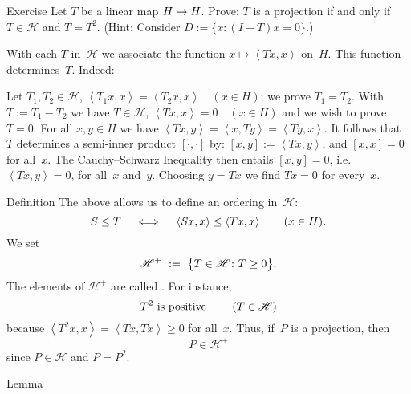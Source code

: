 \documentclass[main.tex]{subfiles}
\begin{document}
%
%
\begin{psec}{5.7}{Exercise}
Let $T$ be a linear map $H\rightarrow H$.
Prove: $T$ is a projection
if and only if~$T\in\mathscr H$ and $T=T^2$.
(Hint: Consider $D:=\{x\colon (I-T)x=0\}$.)
\end{psec}
%
%
\begin{psec}{5.8}%
With each $T$ in~$\mathscr H$
we associate the function 
$x\mapsto\left<Tx,x\right>$ on~$H$.
This function determines~$T$.
Indeed:

Let $T_1,T_2\in\mathscr H$,
$\left< T_1 x,x\right> = \left<T_2 x,x\right>\quad (x\in H)$;
we prove $T_1 = T_2$.
With $T:=T_1 - T_2$
we have $T\in\mathscr H$,
$\left< Tx,x\right>=0\quad (x\in H)$
and we wish to prove~$T=0$.
For all $x,y\in H$ we have
$\left<Tx,y\right>=\left<x,Ty\right>=\left<Ty,x\right>$.
It follows that~$T$ determines a semi-inner product $[\cdot,\cdot]$
by: $[x,y]:=\left<Tx,y\right>$,
and $[x,x]=0$ for all~$x$.
The Cauchy--Schwarz Inequality then entails $[x,y]=0$,
i.e. $\left<Tx,y\right>=0$, for all~$x$ and~$y$.
Choosing $y=Tx$ we find $Tx=0$ for every~$x$.
\end{psec}
%
%
\begin{psec}{5.9}{Definition}
The above allows us to define an ordering in~$\mathscr H$:
\begin{equation*}
S\leq T\quad \iff \quad
\left<Sx,x\right>\leq \left<Tx,x\right>\qquad (x\in H)\text{.}
\end{equation*}
We set
\begin{equation*}
{\mathscr H}^+ \ :=\ \bigl\{T\in\mathscr H\colon T\geq 0\bigr\}\htam{.}
\end{equation*}
The elements of ${\mathscr H}^+$ are called
.
For instance,
\begin{equation*}
T^2\text{\  is positive }\qquad (T\in\mathscr H)
\end{equation*}
because $\left< T^2 x, x\right> = \left<Tx,Tx\right>\geq 0$
for all~$x$.
Thus,
if~$P$ is a projection,
then
\begin{equation*}
P\in{\mathscr H}^+
\end{equation*}
since $P\in \mathscr H$ and $P=P^2$.
\end{psec}
%
%
\begin{psec}{5.10}{Lemma}\end{psec}
\end{document}
